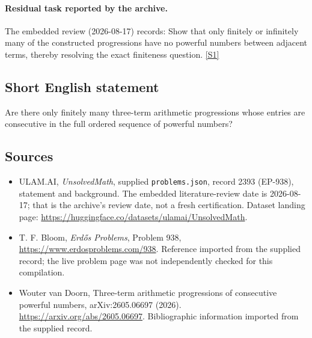 \documentclass[11pt,a4paper]{article}
\newcommand{\sref}[2]{\hyperlink{source:#1:#2}{[S#2]}}
\begin{document}
\paragraph{Residual task reported by the archive.}

The embedded review (2026-08-17) records: Show that only finitely or infinitely many of the constructed progressions have no powerful numbers between adjacent terms, thereby resolving the exact finiteness question. \sref{2393}{1}

\subsection{Short English statement}

Are there only finitely many three-term arithmetic progressions whose entries are consecutive in the full ordered sequence of powerful numbers?

\subsection{Sources}

{\small

\begin{itemize}

\item[\hypertarget{source:2393:1}{S1}] ULAM.AI, \emph{UnsolvedMath}, supplied \texttt{problems.json}, record 2393 (EP-938), statement and background. The embedded literature-review date is 2026-08-17; that is the archive’s review date, not a fresh certification. Dataset landing page: \url{https://huggingface.co/datasets/ulamai/UnsolvedMath}.

\item[\hypertarget{source:2393:2}{S2}] T. F. Bloom, \emph{Erdős Problems}, Problem 938, \url{https://www.erdosproblems.com/938}. Reference imported from the supplied record; the live problem page was not independently checked for this compilation.

\item[\hypertarget{source:2393:3}{S3}] Wouter van Doorn, Three-term arithmetic progressions of consecutive powerful numbers, arXiv:2605.06697 (2026). \url{https://arxiv.org/abs/2605.06697}. Bibliographic information imported from the supplied record.

\end{itemize}

}

\label{end:2393}
\end{document}
